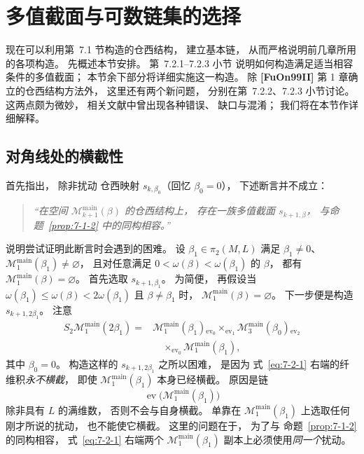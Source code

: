 
\section{多值截面与可数链集的选择}
\label{sec:7-2}

现在可以利用第~7.1 节构造的仓西结构，
建立基本链，
从而严格说明前几章所用的各项构造。
先概述本节安排。
第~7.2.1--7.2.3 小节
说明如何构造满足适当相容条件的多值截面；
本节余下部分将详细实施这一构造。
除
\textbf{[FuOn99II]}
第 1 章确立的仓西结构方法外，
这里还有两个新问题，
分别在第~7.2.2、7.2.3 小节讨论。
这两点颇为微妙，
相关文献中曾出现各种错误、
缺口与混淆；
我们将在本节作详细解释。

\subsection{对角线处的横截性}
\label{subsec:7-2-1}
%
首先指出，
除非扰动
仓西映射
$s_{k,\beta_0}$（回忆 $\beta_0=0$），
下述断言并不成立：
\begin{quote}
\itshape
“在空间
$\mathcal M^{\mathrm{main}}_{k+1}(\beta)$
的仓西结构上，
存在一族多值截面
$s_{k+1,\beta}$，
与命题~\ref{prop:7-1-2}
中的同构相容。”
\end{quote}

说明尝试证明此断言时会遇到的困难。
设
$\beta_1\in\pi_2(M,L)$
满足
$\beta_1\ne0$、
$\mathcal M^{\mathrm{main}}_1(\beta_1)
\ne\varnothing$，
且对任意满足
$0<\omega(\beta)<\omega(\beta_1)$
的 $\beta$，
都有
$\mathcal M^{\mathrm{main}}_1(\beta)
=\varnothing$。
首先选取
$s_{k+1,\beta_1}$。
为简便，
再假设当
$\omega(\beta_1)
\le\omega(\beta)
<2\omega(\beta_1)$
且 $\beta\ne\beta_1$ 时，
$\mathcal M^{\mathrm{main}}_1(\beta)
=\varnothing$。
下一步便是构造
$s_{k+1,2\beta_1}$。
注意
\begin{equation}
\begin{aligned}
S_2\mathcal M^{\mathrm{main}}_1(2\beta_1)
={}&
\mathcal M^{\mathrm{main}}_1(\beta_1)
{}_{\operatorname{ev}_0}
\times_{\operatorname{ev}_1}
\mathcal M^{\mathrm{main}}_3(\beta_0)
{}_{\operatorname{ev}_2}\\
&\quad\times_{\operatorname{ev}_0}
\mathcal M^{\mathrm{main}}_1(\beta_1),
\end{aligned}
\tag{7.2.1}\label{eq:7-2-1}
\end{equation}
其中 $\beta_0=0$。
构造这样的
$s_{k+1,2\beta_1}$
之所以困难，
是因为
式~\eqref{eq:7-2-1}
右端的纤维积\emph{永不横截}，
即使
$\mathcal M^{\mathrm{main}}_1(\beta_1)$
本身已经横截。
原因是链
\[
\operatorname{ev}
\bigl(
\mathcal M^{\mathrm{main}}_1(\beta_1)
\bigr)
\]
除非具有 $L$ 的满维数，
否则不会与自身横截。
单靠在
$\mathcal M^{\mathrm{main}}_1(\beta_1)$
上选取任何刚才所说的扰动，
也不能使它横截。
这里的问题在于，
为了与
命题~\ref{prop:7-1-2}
的同构相容，
式~\eqref{eq:7-2-1}
右端两个
$\mathcal M^{\mathrm{main}}_1(\beta_1)$
副本上必须使用\emph{同一个}扰动。

